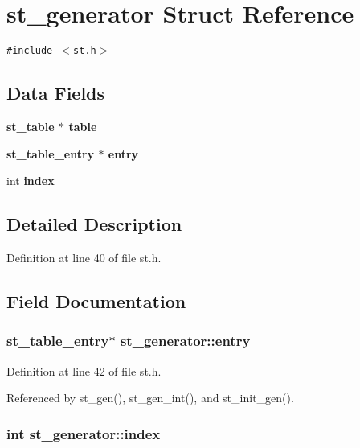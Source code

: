 \section{st\_\-generator Struct Reference}
\label{structst__generator}
{\tt \#include $<$st.h$>$}

\subsection*{Data Fields}
\begin{CompactItemize}
\item 
\bf{st\_\-table} $\ast$ \bf{table}
\item 
\bf{st\_\-table\_\-entry} $\ast$ \bf{entry}
\item 
int \bf{index}
\end{CompactItemize}


\subsection{Detailed Description}




Definition at line 40 of file st.h.

\subsection{Field Documentation}
\subsubsection{\setlength{\rightskip}{0pt plus 5cm}\bf{st\_\-table\_\-entry}$\ast$ \bf{st\_\-generator::entry}}\label{structst__generator_950d044c22c5ee51f1dc00fbc82f7e35}




Definition at line 42 of file st.h.

Referenced by st\_\-gen(), st\_\-gen\_\-int(), and st\_\-init\_\-gen().
\subsubsection{\setlength{\rightskip}{0pt plus 5cm}int \bf{st\_\-generator::index}}\label{structst__generator_f2fe4c02d62ac650ad39cc28a424b798}




